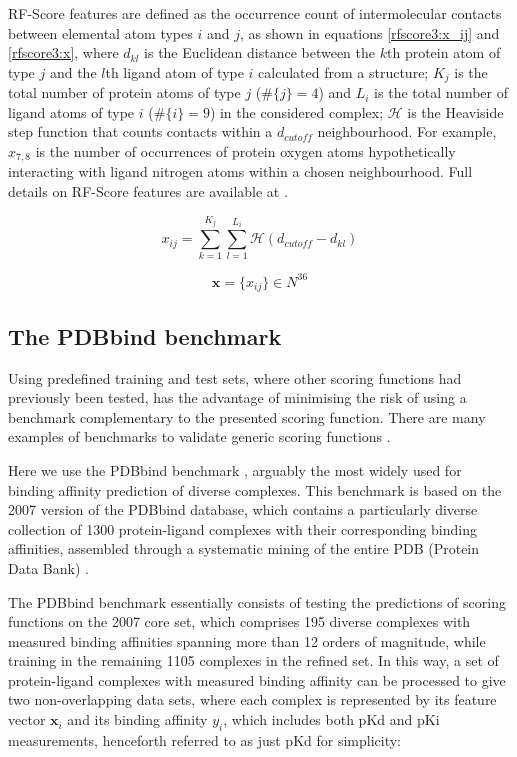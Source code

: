 RF-Score features are defined as the occurrence count of intermolecular contacts between elemental atom types $i$ and $j$, as shown in equations \eqref{rfscore3:x_ij} and \eqref{rfscore3:x}, where $d_{kl}$ is the Euclidean distance between the $k$th protein atom of type $j$ and the $l$th ligand atom of type $i$ calculated from a structure; $K_j$ is the total number of protein atoms of type $j$ ($\#\{j\}=4$) and $L_i$ is the total number of ligand atoms of type $i$ ($\#\{i\}=9$) in the considered complex; $\mathcal{H}$ is the Heaviside step function that counts contacts within a $d_{cutoff}$ neighbourhood. For example, $x_{7,8}$ is the number of occurrences of protein oxygen atoms hypothetically interacting with ligand nitrogen atoms within a chosen neighbourhood. Full details on RF-Score features are available at \citep{564,1295}.

\begin{equation}
\label{rfscore3:x_ij}
x_{ij}=\sum_{k=1}^{K_j}\sum_{l=1}^{L_i}\mathcal{H}(d_{cutoff}-d_{kl})
\end{equation}

\begin{equation}
\label{rfscore3:x}
\mathbf x=\{x_{ij}\}\in N^{36}
\end{equation}

\subsection{The PDBbind benchmark}

Using predefined training and test sets, where other scoring functions had previously been tested, has the advantage of minimising the risk of using a benchmark complementary to the presented scoring function. There are many examples of benchmarks to validate generic scoring functions \citep{1455,1456,571,1457}.

Here we use the PDBbind benchmark \citep{1313}, arguably the most widely used for binding affinity prediction of diverse complexes. This benchmark is based on the 2007 version of the PDBbind database, which contains a particularly diverse collection of 1300 protein-ligand complexes with their corresponding binding affinities, assembled through a systematic mining of the entire PDB (Protein Data Bank) \citep{540,537}.

The PDBbind benchmark essentially consists of testing the predictions of scoring functions on the 2007 core set, which comprises 195 diverse complexes with measured binding affinities spanning more than 12 orders of magnitude, while training in the remaining 1105 complexes in the refined set. In this way, a set of protein-ligand complexes with measured binding affinity can be processed to give two non-overlapping data sets, where each complex is represented by its feature vector $\mathbf x_i$ and its binding affinity $y_i$, which includes both pKd and pKi measurements, henceforth referred to as just pKd for simplicity:

